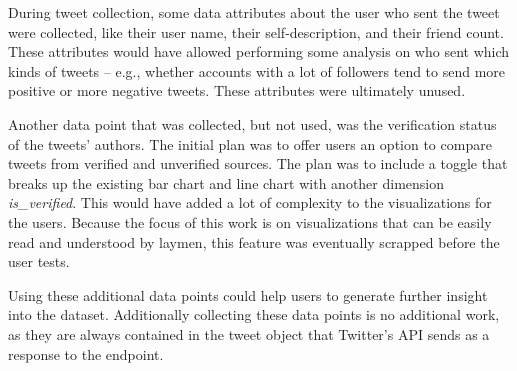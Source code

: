 During tweet collection, some data attributes about the user who sent the tweet were collected, like their user name, their self-description, and their friend count. These attributes would have allowed performing some analysis on who sent which kinds of tweets – e.g., whether accounts with a lot of followers tend to send more positive or more negative tweets. These attributes were ultimately unused.

Another data point that was collected, but not used, was the verification status of the tweets' authors. The initial plan was to offer users an option to compare tweets from verified and unverified sources. The plan was to include a toggle that breaks up the existing bar chart and line chart with another dimension \emph{is\_verified}. This would have added a lot of complexity to the visualizations for the users. Because the focus of this work is on visualizations that can be easily read and understood by laymen, this feature was eventually scrapped before the user tests.

Using these additional data points could help users to generate further insight into the dataset. Additionally collecting these data points is no additional work, as they are always contained in the tweet object that Twitter's API sends as a response to the endpoint.
